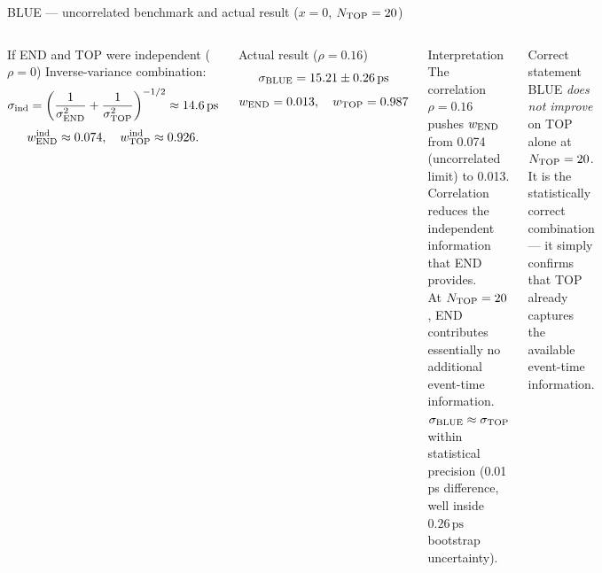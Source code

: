 \documentclass[aspectratio=169,9pt]{beamer}
\newcommand{\sigERRcomb}{0.26\,\mathrm{ps}}
\newcommand{\wENDval}{0.013}
\newcommand{\wTOPval}{0.987}
\newcommand{\rhoETval}{0.16}
\begin{document}
\begin{frame}{BLUE — uncorrelated benchmark and actual result ($x=0$, $N_{\rm TOP}=20$)}
  \begin{columns}[T]
      \begin{block}{If END and TOP were independent ($\rho=0$)}
        {\small Inverse-variance combination:
        \[
          \sigma_{\rm ind}
          = \left(\frac{1}{\sigma_{\rm END}^2}+\frac{1}{\sigma_{\rm TOP}^2}\right)^{-1/2}
          \approx 14.6\,\mathrm{ps}
        \]
        \[
          w_{\rm END}^{\rm ind}\approx 0.074,\quad w_{\rm TOP}^{\rm ind}\approx 0.926.
        \]}
      \end{block}
      \begin{block}{Actual result ($\rho=\rhoETval$)}
        \[
          \sigma_{\rm BLUE} = 15.21\pm\sigERRcomb
        \]
        \[
          w_{\rm END}=\wENDval,\quad w_{\rm TOP}=\wTOPval
        \]
      \end{block}
      \begin{alertblock}{Interpretation}
        {\small The correlation $\rho=\rhoETval$ pushes $w_{\rm END}$ from 0.074
        (uncorrelated limit) to 0.013.
        Correlation reduces the independent information that END provides.\\[4pt]
        At $N_{\rm TOP}=20$, END contributes essentially no additional
        event-time information.
        $\sigma_{\rm BLUE}\approx\sigma_{\rm TOP}$ within statistical precision
        (0.01\,ps difference, well inside $\sigERRcomb$ bootstrap uncertainty).}
      \end{alertblock}
      \begin{block}{Correct statement}
        {\small BLUE \textit{does not improve} on TOP alone at $N_{\rm TOP}=20$.
        It is the statistically correct combination — it simply confirms that TOP
        already captures the available event-time information.}
      \end{block}
  \end{columns}
\end{frame}
\end{document}
